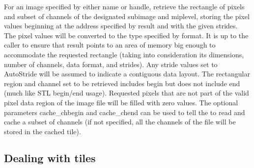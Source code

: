 For an image specified by either name or handle,
retrieve the rectangle of pixels and subset of channels
of the designated {\cf subimage} and {\cf miplevel}, storing the pixel values
beginning at the address specified by result and with the given strides.
The pixel values will be
converted to the type specified by {\cf format}.  It is up to the caller
to ensure that result points to an area of memory big enough to
accommodate the requested rectangle (taking into consideration its
dimensions, number of channels, data format, and strides).
Any stride values set to {\cf AutoStride} will be assumed to indicate
a contiguous data layout.
The rectangular region and channel set to be retrieved includes 
{\cf begin} but does not
include {\cf end} (much like STL begin/end usage).
Requested pixels that are not part of the valid pixel data region of the
image file will be filled with zero values. The optional parameters
{\cf cache_chbegin} and {\cf cache_chend} can be used to tell the
\ImageCache to read and cache a subset of channels (if not specified,
all the channels of the file will be stored in the cached tile).
\apiend


\subsection{Dealing with tiles}
\label{sec:imagecache:api:tiles}


